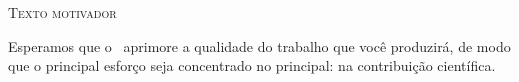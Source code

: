 \begin{mdframed}[style=plainSty] %

{\center \textsc{Texto motivador} \par}

\noindent Esperamos que o \abnTeX\ aprimore a qualidade do trabalho que você produzirá, de modo que o principal esforço seja concentrado no principal: na contribuição científica.
   
\end{mdframed}